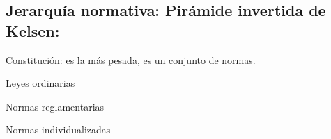 \subsection{Jerarquía normativa: Pirámide invertida de Kelsen:}
    \begin{etaremune}
        \item Constitución: es la más pesada, es un conjunto de normas.
        \item Leyes ordinarias
        \item Normas reglamentarias
        \item Normas individualizadas
    \end{etaremune}

